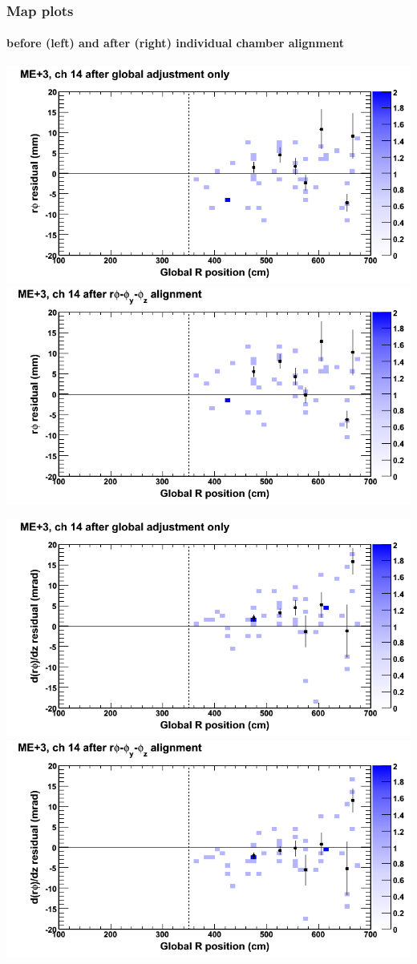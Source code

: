 \documentclass[compress]{beamer}
\begin{document}
\begin{frame}
\frametitle{Map plots}
\framesubtitle{before (left) and after (right) individual chamber alignment}
\includegraphics[width=0.5\linewidth]{ringmapplots_3dof/before_CSCvsr_mep3ch14_x.png} \includegraphics[width=0.5\linewidth]{ringmapplots_3dof/after_CSCvsr_mep3ch14_x.png}

\includegraphics[width=0.5\linewidth]{ringmapplots_3dof/before_CSCvsr_mep3ch14_dxdz.png} \includegraphics[width=0.5\linewidth]{ringmapplots_3dof/after_CSCvsr_mep3ch14_dxdz.png}
\end{frame}
\end{document}
